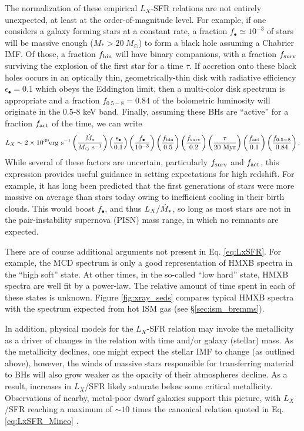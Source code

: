 The normalization of these empirical $L_X$-SFR relations are not entirely unexpected, at least at the order-of-magnitude level. For example, if one considers a galaxy forming stars at a constant rate, a fraction $f_{\bullet} \simeq 10^{-3}$ of stars will be massive enough ($M_{\ast} > 20 \ M_{\odot}$) to form a black hole assuming a Chabrier IMF. Of those, a fraction $f_{\text{bin}}$ will have binary companions, with a fraction $f_{\text{surv}}$ surviving the explosion of the first star for a time $\tau$. If accretion onto these black holes occurs in an optically thin, geometrically-thin disk with radiative efficiency $\epsilon_{\bullet} = 0.1$ which obeys the Eddington limit, then a multi-color disk spectrum is appropriate and a fraction $f_{0.5-8}=0.84$ of the bolometric luminosity will originate in the 0.5-8 keV band. Finally, assuming these BHs are ``active'' for a fraction $f_{\text{act}}$ of the time, we can write \cite{Mirabel2011,Mirocha2018}
\begin{equation}
	L_X \sim 2 \times 10^{39} \mathrm{erg} \ \mathrm{s}^{-1} \left(\frac{\SFR}{\SFRunits} \right) \left(\frac{\epsilon_{\bullet}}{0.1}\right) \left(\frac{f_{\bullet}}{10^{-3}} \right) \left(\frac{\fbin}{0.5} \right) \left(\frac{\fsurv}{0.2} \right) \left(\frac{\tau}{20 \ \mathrm{Myr}} \right) \left(\frac{\fact}{0.1} \right) \left(\frac{f_{0.5-8}}{0.84} \right) . \label{eq:LxSFR}
\end{equation}
While several of these factors are uncertain, particularly $f_{\text{surv}}$ and $f_{\text{act}}$, this expression provides useful guidance in setting expectations for high redshift. For example, it has long been predicted that the first generations of stars were more massive on average than stars today owing to inefficient cooling in their birth clouds. This would boost $f_{\bullet}$, and thus $L_X/\dot{M}_{\ast}$, so long as most stars are not in the pair-instability supernova (PISN) mass range, in which no remnants are expected. 

There are of course additional arguments not present in Eq. \ref{eq:LxSFR}. For example, the MCD spectrum is only a good representation of HMXB spectra in the ``high soft'' state. At other times, in the so-called ``low hard'' state, HMXB spectra are well fit by a power-law. The relative amount of time spent in each of these states is unknown. Figure \ref{fig:xray_seds} compares typical HMXB spectra with the spectrum expected from hot ISM gas (see \S\ref{sec:ism_bremms}).

In addition, physical models for the $L_X$-SFR relation may invoke the metallicity as a driver of changes in the relation with time and/or galaxy (stellar) mass. As the metallicity declines, one might expect the stellar IMF to change (as outlined above), however, the winds of massive stars responsible for transferring material to BHs will also grow weaker as the opacity of their atmospheres decline. As a result, increases in $L_X$/SFR likely saturate below some critical metallicity. Observations of nearby, metal-poor dwarf galaxies support this picture, with $L_X$/SFR reaching a maximum of $\sim 10$ times the canonical relation quoted in Eq. \ref{eq:LxSFR_Mineo} \cite{Mineo2012a}.


